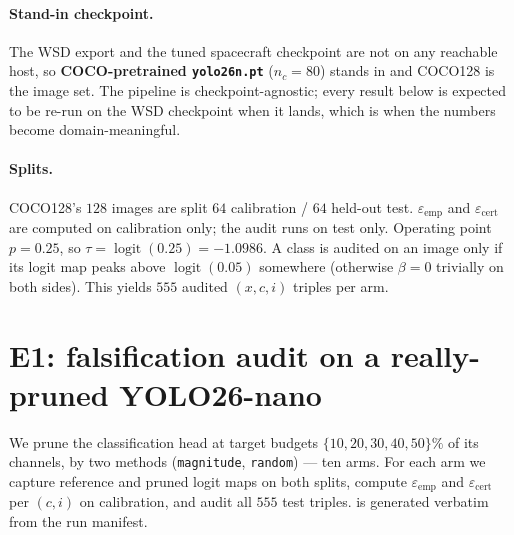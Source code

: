 \documentclass[11pt]{article}
\newcommand{\code}[1]{\texttt{\small #1}}
\newcommand{\epscert}{\varepsilon_{\mathrm{cert}}}
\newcommand{\epsemp}{\varepsilon_{\mathrm{emp}}}
\newcommand{\Betti}{\beta}
\theoremstyle{definition}
\theoremstyle{plain}
\begin{document}
\paragraph{Stand-in checkpoint.} The WSD export and the tuned spacecraft
checkpoint are not on any reachable host, so \textbf{COCO-pretrained
\code{yolo26n.pt}} ($n_c = 80$) stands in and COCO128 is the image set. The
pipeline is checkpoint-agnostic; every result below is expected to be re-run on
the WSD checkpoint when it lands, which is when the numbers become
domain-meaningful.

\paragraph{Splits.} COCO128's $128$ images are split $64$ calibration / $64$
held-out test. $\epsemp$ and $\epscert$ are computed on calibration only; the
audit runs on test only. Operating point $p = 0.25$, so $\tau =
\operatorname{logit}(0.25) = -1.0986$. A class is audited on an image only if its
logit map peaks above $\operatorname{logit}(0.05)$ somewhere (otherwise
$\Betti = 0$ trivially on both sides). This yields $555$ audited $(x,c,i)$
triples per arm.

\section{E1: falsification audit on a really-pruned YOLO26-nano}
\label{sec:e1}

We prune the classification head at target budgets
$\{10, 20, 30, 40, 50\}\si{\percent}$ of its channels, by two methods
(\code{magnitude}, \code{random}) --- ten arms. For each arm we capture reference
and pruned logit maps on both splits, compute $\epsemp$ and $\epscert$ per
$(c,i)$ on calibration, and audit all $555$ test triples.  is
generated verbatim from the run manifest.
\end{document}
